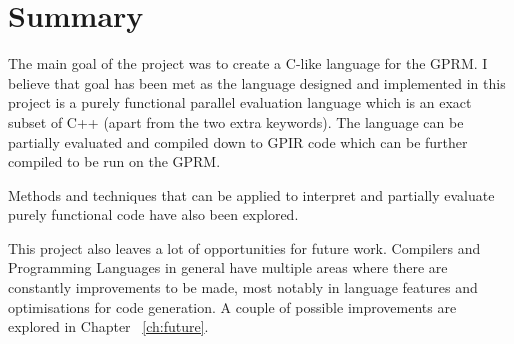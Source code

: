 \section{Summary}
The main goal of the project was to create a C-like language for the GPRM.
I believe that goal has been met as the language designed and implemented 
in this project is a purely functional parallel evaluation language which is an exact subset of C++ 
(apart from the two extra keywords). The language can be partially evaluated and compiled down to GPIR code 
which can be further compiled to be run on the GPRM. 

Methods and techniques that can be applied to interpret and partially evaluate purely
functional code have also been explored.

This project also leaves a lot of opportunities for future work. Compilers and Programming Languages in general have
multiple areas where there are constantly improvements to be made, most notably in language features and optimisations 
for code generation. A couple of possible improvements are explored in Chapter ~\ref{ch:future}.





